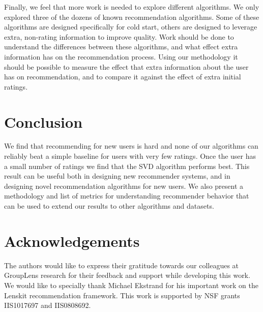 \documentclass[letterpaper]{sig-alternate}
\begin{document}
  Finally, we feel that more work is needed to explore different algorithms.
  We only explored three of the dozens of known recommendation algorithms.
  Some of these algorithms are designed specifically for cold start, others are designed to leverage extra, non-rating information to improve quality.
  Work should be done to understand the differences between these algorithms, and what effect extra information has on the recommendation process.
  Using our methodology it should be possible to measure the effect that extra information about the user has on recommendation, and to compare it against the effect of extra initial ratings.



\section{Conclusion}
  We find that recommending for new users is hard and none of our algorithms can reliably beat a simple baseline for users with very few ratings.
  Once the user has a small number of ratings we find that the SVD algorithm performs best.
  This result can be useful both in designing new recommender systems, and in designing novel recommendation algorithms for new users.
  We also present a methodology and list of metrics for understanding recommender behavior that can be used to extend our results to other algorithms and datasets.


\section{Acknowledgements}
  
  The authors would like to express their gratitude towards our colleagues at GroupLens research for their feedback and support while developing this work.
  We would like to specially thank Michael Ekstrand for his  important work on the Lenskit recommendation framework.
  This work is supported by NSF grants IIS1017697 and IIS0808692.


\end{document}
